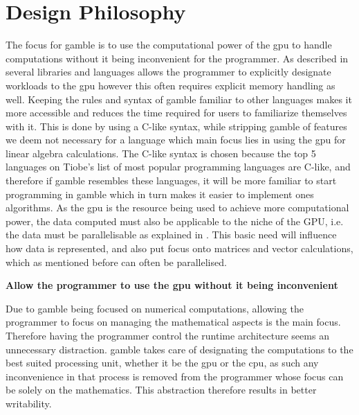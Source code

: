 \section{Design Philosophy}\label{sec:phil}

The focus for \gls{gamble} is to use the computational power of the \acrshort{gpu} to handle computations without it being inconvenient for the programmer.
As described in  several libraries and languages allows the programmer to explicitly designate workloads to the \acrshort{gpu} however this often requires explicit memory handling as well.
Keeping the rules and syntax of \gls{gamble} familiar to other languages makes it more accessible and reduces the time required for users to familiarize themselves with it.
This is done by using a C-like syntax, while stripping \gls{gamble} of features we deem not necessary for a language which main focus lies in using the \acrshort{gpu} for  linear algebra calculations. 
The C-like syntax is chosen because the top 5 languages on Tiobe's list of most popular programming languages are C-like, and therefore if \gls{gamble} resembles these languages, it will be more familiar to start programming in \gls{gamble} which in turn makes it easier to implement ones algorithms. \citep{TIOBE}
As the \acrshort{gpu} is the resource being used to achieve more computational power, the data computed must also be applicable to the niche of the GPU, i.e. the data must be parallelisable as explained in .
This basic need will influence how data is represented, and also put focus onto matrices and vector calculations, which as mentioned before can often be parallelised.

\textbf{Allow the programmer to use the \acrshort{gpu} without it being inconvenient}

Due to \gls{gamble} being focused on numerical computations, allowing the programmer to focus on managing the mathematical aspects is the main focus.
Therefore having the programmer control the runtime architecture seems an unnecessary distraction.
\gls{gamble} takes care of designating the computations to the best suited processing unit, whether it be the \acrshort{gpu} or the \acrshort{cpu}, as such any inconvenience in that process is removed from the programmer whose focus can be solely on the mathematics.
This abstraction therefore results in better writability.

